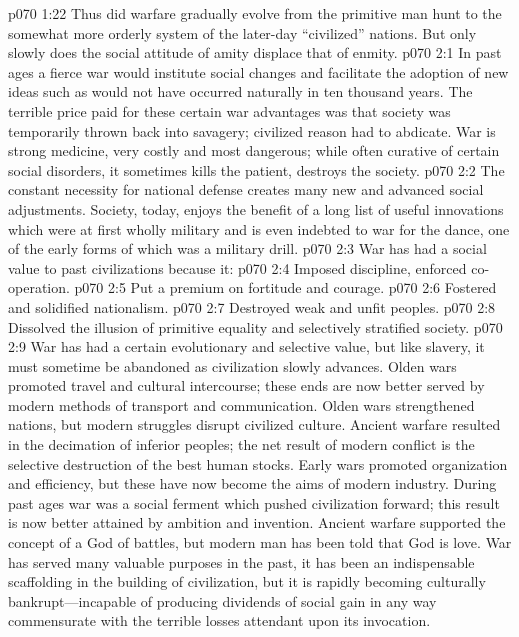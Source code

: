 \vs p070 1:22 Thus did warfare gradually evolve from the primitive man hunt to the somewhat more orderly system of the later\hyp{}day “civilized” nations. But only slowly does the social attitude of amity displace that of enmity.
\vs p070 2:1 In past ages a fierce war would institute social changes and facilitate the adoption of new ideas such as would not have occurred naturally in ten thousand years. The terrible price paid for these certain war advantages was that society was temporarily thrown back into savagery; civilized reason had to abdicate. War is strong medicine, very costly and most dangerous; while often curative of certain social disorders, it sometimes kills the patient, destroys the society.
\vs p070 2:2 The constant necessity for national defense creates many new and advanced social adjustments. Society, today, enjoys the benefit of a long list of useful innovations which were at first wholly military and is even indebted to war for the dance, one of the early forms of which was a military drill.
\pc \vs p070 2:3 War has had a social value to past civilizations because it:
\pc \vs p070 2:4 \bibnobreakspace Imposed discipline, enforced co\hyp{}operation.
\vs p070 2:5 \bibnobreakspace Put a premium on fortitude and courage.
\vs p070 2:6 \bibnobreakspace Fostered and solidified nationalism.
\vs p070 2:7 \bibnobreakspace Destroyed weak and unfit peoples.
\vs p070 2:8 \bibnobreakspace Dissolved the illusion of primitive equality and selectively stratified society.
\pc \vs p070 2:9 War has had a certain evolutionary and selective value, but like slavery, it must sometime be abandoned as civilization slowly advances. Olden wars promoted travel and cultural intercourse; these ends are now better served by modern methods of transport and communication. Olden wars strengthened nations, but modern struggles disrupt civilized culture. Ancient warfare resulted in the decimation of inferior peoples; the net result of modern conflict is the selective destruction of the best human stocks. Early wars promoted organization and efficiency, but these have now become the aims of modern industry. During past ages war was a social ferment which pushed civilization forward; this result is now better attained by ambition and invention. Ancient warfare supported the concept of a God of battles, but modern man has been told that God is love. War has served many valuable purposes in the past, it has been an indispensable scaffolding in the building of civilization, but it is rapidly becoming culturally bankrupt---incapable of producing dividends of social gain in any way commensurate with the terrible losses attendant upon its invocation.
